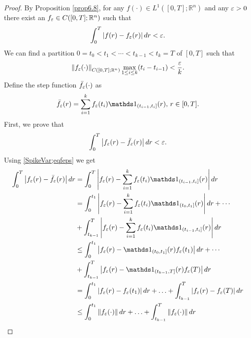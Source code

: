\begin{proof}
    By Proposition \cref{prop6.8}, for any $f(\cdot) \in L^{1}([0,T]; \mathbb{R}^n)$
    and any $\varepsilon >0$ there exist an $f_{\varepsilon} \in C([0,T]; \mathbb{R}^n)$
    such that
    \begin{equation}
        \int_{0}^{T} \left\lvert f(r) - f_{\varepsilon}(r)\right\rvert dr < \varepsilon.
    \end{equation}
    We can find a partition $0 = t_0<t_1 < \cdots < t_{k-1} < t_k = T$ of $[0,T]$
    such that
    \begin{equation}
        \norm{f_{\veps}(\cdot)}_{C([0,T]; \mathbb{R}^n)} \max_{1 \leq i \leq k}%
            (t_i -t_{i-1}) < \dfrac{\veps}{k}.
    \end{equation}
    Define the step function $\Bar{f}_{\varepsilon}(\cdot)$ as
    \begin{equation}\label{SpikeVar;eqfeps}
        \Bar{f}_{\veps}(r) = \sum_{i=1}^{k}f_{\veps}(t_i)\ind_{(t_{i-1},t_i]}(r), \, r \in [0,T].
    \end{equation}
    First, we prove that 
    \begin{equation}
        \int_{0}^{T}\left\lvert f_{\varepsilon}(r) - \Bar{f}_{\varepsilon}(r)\right\rvert dr < \varepsilon.
    \end{equation}
    Using \cref{SpikeVar;eqfeps} we get
    \begin{align*}
        \int_{0}^{T}\abs{f_{\veps}(r) - \Bar{f}_{\veps}(r)}dr %
        &=
            \int_{0}^{T}\abs{f_{\veps}(r) - \sum_{i=1}^{k}f_{\veps}(t_i)\ind_{(t_{i-1},t_i]}(r) }dr 
        \\
        &=
            \int_{0}^{t_1}\abs{f_{\veps}(r) 
            - \sum_{i=1}^{k}f_{\veps}(t_i)%
            \ind_{(t_0,t_1]}(r) }dr + \cdots 
        \\
        & + \int_{t_{k-1}}^{T}\abs{f_{\veps}(r) - %
            \sum_{i=1}^{k}f_{\veps}(t_i)\ind_{(t_{i-1},t_i]}(r) }dr 
        \\
        &\leq   
            \int_{0}^{t_1}\abs{f_{\veps}(r) - \ind_{(t_0,t_1]}(r) f_{\veps}(t_1)} dr  + \cdots 
        \\
        & + \int_{t_{k-1}}^{T}\abs{f_{\veps}(r) - \ind_{(t_{k-1},T]}(r) f_{\veps}(T)}dr \\
        &=
            \int_{0}^{t_1}\abs{f_{\veps}(r) - f_{\veps}(t_1)} dr + \ldots + %
            \int_{t_{k-1}}^{T}\abs{f_{\veps}(r) - f_{\veps}(T)}dr \\
        &\leq
            \int_{0}^{t_1}\norm{f_{\veps}(\cdot)}dr + \ldots + %
            \int_{t_{k-1}}^{T}\norm{f_{\veps}(\cdot)}dr \\

\end{align*}
\end{proof}
